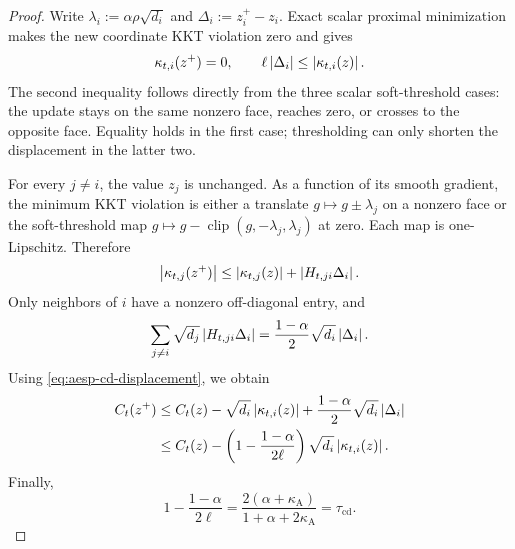 \begin{proof}
Write $\lambda_i:=\alpha\rho\sqrt{d_i}$ and
$\Delta_i:=z_i^+-z_i$.  Exact scalar proximal minimization makes the new
coordinate KKT violation zero and gives
\begin{equation}
  \kappa_{t,i}(z^+)=0,
  \qquad
  \ell\left\lvert \Delta_i \right\rvert\leq\left\lvert \kappa_{t,i}(z) \right\rvert.
  \label{eq:aesp-cd-displacement}
\end{equation}
The second inequality follows directly from the three scalar soft-threshold
cases: the update stays on the same nonzero face, reaches zero, or crosses to
the opposite face.  Equality holds in the first case; thresholding can only
shorten the displacement in the latter two.

For every $j\neq i$, the value $z_j$ is unchanged.  As a function of its
smooth gradient, the minimum KKT violation is either a translate
$g\mapsto g\pm\lambda_j$ on a nonzero face or the soft-threshold map
$g\mapsto g-\operatorname{clip}(g,-\lambda_j,\lambda_j)$ at zero.  Each map
is one-Lipschitz.  Therefore
\begin{equation*}
 \left\lvert \kappa_{t,j}(z^+) \right\rvert
 \leq
 \left\lvert \kappa_{t,j}(z) \right\rvert+\left\lvert H_{t,ji}\Delta_i \right\rvert.
\end{equation*}
Only neighbors of $i$ have a nonzero off-diagonal entry, and
\begin{equation*}
 \sum_{j\neq i}\sqrt{d_j}\left\lvert H_{t,ji}\Delta_i \right\rvert
 =\frac{1-\alpha}{2}\sqrt{d_i}\left\lvert \Delta_i \right\rvert.
\end{equation*}
Using \cref{eq:aesp-cd-displacement}, we obtain
\begin{align*}
 C_t(z^+)
 &\leq C_t(z)-\sqrt{d_i}\left\lvert \kappa_{t,i}(z) \right\rvert
       +\frac{1-\alpha}{2}\sqrt{d_i}\left\lvert \Delta_i \right\rvert\\
 &\leq C_t(z)
 -\left(1-\frac{1-\alpha}{2\ell}\right)
  \sqrt{d_i}\left\lvert \kappa_{t,i}(z) \right\rvert.
\end{align*}
Finally,
\begin{equation*}
 1-\frac{1-\alpha}{2\ell}
 =\frac{2(\alpha+\kappa_{\mathrm A})}
        {1+\alpha+2\kappa_{\mathrm A}}
 =\tau_{\mathrm{cd}}.
\end{equation*}
\end{proof}

